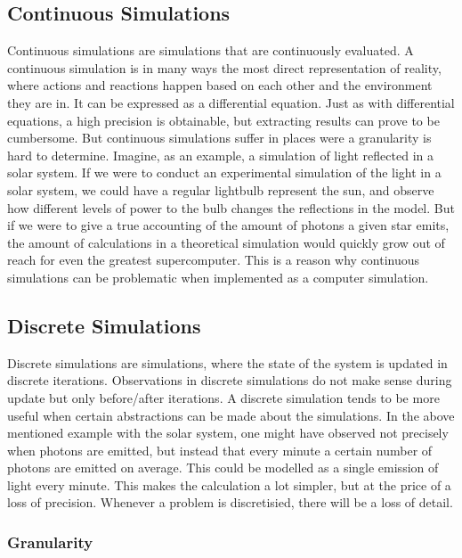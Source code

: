 \subsection{Continuous Simulations}
Continuous simulations are simulations that are continuously evaluated. A continuous simulation is in many ways the most direct representation of reality, where actions and reactions happen based on each other and the environment they are in. It can be expressed as a differential equation. Just as with differential equations, a high precision is obtainable, but extracting results can prove to be cumbersome. But continuous simulations suffer in places were a granularity is hard to determine. Imagine, as an example, a simulation of light reflected in a solar system. If we were to conduct an experimental simulation of the light in a solar system, we could have a regular lightbulb represent the sun, and observe how different levels of power to the bulb changes the reflections in the model. But if we were to give a true accounting of the amount of photons a given star emits, the amount of calculations in a theoretical simulation would quickly grow out of reach for even the greatest supercomputer. This is a reason why continuous simulations can be problematic when implemented as a computer simulation.
\label{simulationchoise}


\subsection{Discrete Simulations}
Discrete simulations are simulations, where the state of the system is updated in discrete iterations. Observations in discrete simulations do not make sense during update but only before/after iterations. A discrete simulation tends to be more useful when certain abstractions can be made about the simulations. In the above mentioned example with the solar system, one might have observed not precisely when photons are emitted, but instead that every minute a certain number of photons are emitted on average. This could be modelled as a single emission of light every minute. This makes the calculation a lot simpler, but at the price of a loss of precision. Whenever a problem is discretisied, there will be a loss of detail.


\subsubsection{Granularity}

